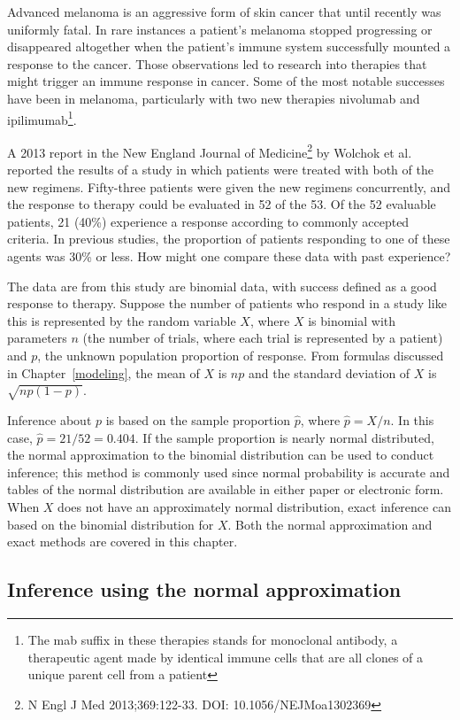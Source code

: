 Advanced melanoma is an aggressive form of skin cancer that until recently was uniformly fatal.  In rare instances a patient's melanoma stopped progressing or disappeared altogether when the patient's immune system successfully mounted a response to the cancer. Those observations led to research into therapies that might trigger an immune response in cancer.  Some of the most notable successes have been in melanoma, particularly with two new therapies nivolumab and ipilimumab\footnote{The mab suffix in these therapies stands for monoclonal antibody, a therapeutic agent made by identical immune cells that are all clones of a unique parent cell from a patient}.

A 2013 report in the New England Journal of Medicine\footnote{N Engl J Med 2013;369:122-33. DOI: 10.1056/NEJMoa1302369} by Wolchok et al. reported the results of a study in which patients were treated with both of the new regimens.  Fifty-three patients were given the new regimens concurrently, and the response to therapy could be evaluated in 52 of the 53.  Of the 52 evaluable patients, 21 (40\%) experience a response according to commonly accepted criteria.  In previous studies, the proportion of patients responding to one of these agents was 30\% or less.  How might one compare these data with past experience?

The data are from this study are binomial data, with success defined as a good response to therapy. Suppose the number of patients who respond in a study like this is represented by the random variable $X$, where $X$ is binomial with parameters $n$ (the number of trials, where each trial is represented by a patient) and $p$, the unknown population proportion of response. From formulas discussed in Chapter~\ref{modeling}, the mean of $X$ is $np$ and the standard deviation of $X$ is $\sqrt{np(1-p)}$.

Inference about $p$ is based on the sample proportion $\hat{p}$, where $\hat{p} = X/n$. In this case, $\hat{p} = 21/52 = 0.404$. If the sample proportion is nearly normal distributed, the normal approximation to the binomial distribution can be used to conduct inference; this method is commonly used since normal probability is accurate and tables of the normal distribution are  available in either paper or electronic form.  When $X$ does not have an approximately normal distribution, exact inference can  based on the binomial distribution for $X$.  Both the normal approximation and exact methods are covered in this chapter.

\subsection{Inference using the normal approximation}

